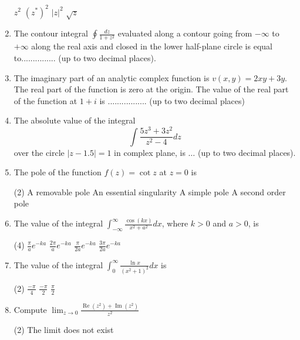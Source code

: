 \begin{note}
\begin{enumerate}[label=\color{ocre}\textbf{\arabic*.}]
\begin{tasks}
		\task[\textbf{A.}] $z^{2}$
		\task[\textbf{B.}]  $\left(z^{*}\right)^{2}$
		\task[\textbf{C.}] $|z|^{2}$
		\task[\textbf{D.}] $\sqrt{z}$
	\end{tasks}
	\item The contour integral $\oint \frac{d z}{1+z^{2}}$ evaluated along a contour going from $-\infty$ to $+\infty$ along the
	real axis and closed in the lower half-plane circle is equal to............... (up to two decimal places).
	{}
	\item The imaginary part of an analytic complex function is $v(x, y)=2 x y+3 y .$ The real part of the function is zero at the origin. The value of the real part of the function at $1+i$ is ................. (up to two decimal places)
	{}
	\item The absolute value of the integral
	$$
	\int \frac{5 z^{3}+3 z^{2}}{z^{2}-4} d z
	$$
	over the circle $|z-1.5|=1$ in complex plane, is $\ldots$ (up to two decimal places).
	{}
	\item The pole of the function $f(z)=\cot z$ at $z=0$ is
	{}
	\begin{tasks}(2)
		\task[\textbf{A.}] A removable pole
		\task[\textbf{B.}] An essential singularity
		\task[\textbf{C.}]  A simple pole
		\task[\textbf{D.}] A second order pole
	\end{tasks}
	\item The value of the integral $\int_{-\infty}^{\infty} \frac{\cos (k x)}{x^{2}+a^{2}} d x$, where $k>0$ and $a>0$, is
	{}
	\begin{tasks}(4)
		\task[\textbf{A.}] $\frac{\pi}{a} e^{-k a}$
		\task[\textbf{B.}] $\frac{2 \pi}{a} e^{-k a}$
		\task[\textbf{C.}] $\frac{\pi}{2 a} e^{-k a}$
		\task[\textbf{D.}] $\frac{3 \pi}{2 a} e^{-k a}$
	\end{tasks}
\item The value of the integral $\int_{0}^{\infty} \frac{\ln x}{\left(x^{2}+1\right)^{2}} d x$ is
{}
\begin{tasks}(2)
	\task[\textbf{b.}]$\frac{-\pi}{4}$
	\task[\textbf{c.}] $\frac{-\pi}{2}$
	\task[\textbf{d.}] $\frac{\pi}{2}$
\end{tasks}
\item Compute $\lim _{z \rightarrow 0} \frac{\operatorname{Re}\left(z^{2}\right)+\operatorname{Im}\left(z^{2}\right)}{z^{2}}$
{}
\begin{tasks}(2)
	\task[\textbf{a.}] The limit does not exist

\end{tasks}
\end{enumerate}
\end{note}
